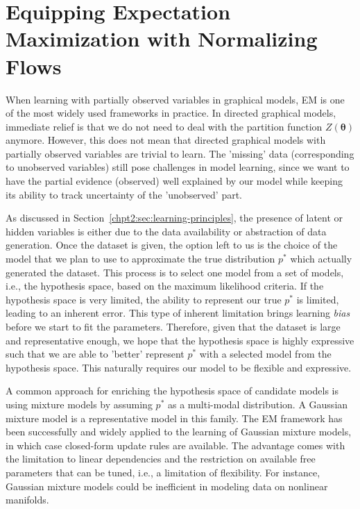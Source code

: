 \chapter{Equipping Expectation Maximization with Normalizing Flows}
\label{chpt6:em-flow}
\graphicspath{{source/chapter6/}}

When learning with partially observed variables in graphical models, EM is one of the most widely used frameworks in practice. In directed graphical models, immediate relief is that we do not need to deal with the partition function $Z(\bm{\theta})$ anymore. However, this does not mean that directed graphical models with partially observed variables are trivial to learn. The 'missing' data (corresponding to unobserved variables) still pose challenges in model learning, since we want to have the partial evidence (observed) well explained by our model while keeping its ability to track uncertainty of the 'unobserved' part.

As discussed in Section~\ref{chpt2:sec:learning-principles}, the presence of latent or hidden variables is either due to the data availability or abstraction of data generation. Once the dataset is given, the option left to us is the choice of the model that we plan to use to approximate the true distribution $p^{\ast}$ which actually generated the dataset. This process is to select one model from a set of models, i.e., the hypothesis space, based on the maximum likelihood criteria. If the hypothesis space is very limited, the ability to represent our true $p^{\ast}$ is limited, leading to an inherent error. This type of inherent limitation brings learning \textit{bias} before we start to fit the parameters.
Therefore, given that the dataset is large and representative enough, we hope that the hypothesis space is highly expressive such that we are able to 'better' represent $p^{\ast}$ with a selected model from the hypothesis space. This naturally requires our model to be flexible and expressive.

A common approach for enriching the hypothesis space of candidate models is using mixture models by assuming $p^{\ast}$ as a multi-modal distribution. A Gaussian mixture model is a representative model in this family. The EM framework has been successfully and widely applied to the learning of Gaussian mixture models, in which case closed-form update rules are available. The advantage comes with the limitation to linear dependencies and the restriction on available free parameters that can be tuned, i.e., a limitation of flexibility. For instance, Gaussian mixture models could be inefficient in modeling data on nonlinear manifolds. 


